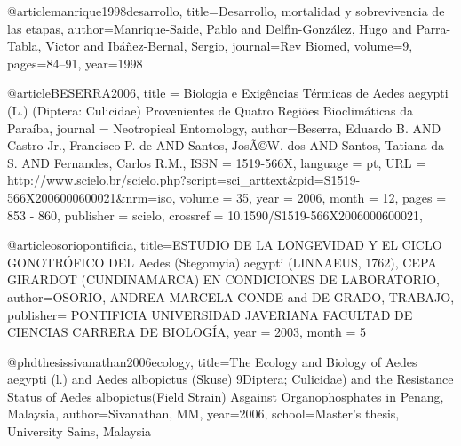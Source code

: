 
@article{manrique1998desarrollo,
  title={Desarrollo, mortalidad y sobrevivencia de las etapas},
  author={Manrique-Saide, Pablo and Delf{\'\i}n-Gonz{\'a}lez, Hugo and Parra-Tabla, Victor and Ib{\'a}{\~n}ez-Bernal, Sergio},
  journal={Rev Biomed},
  volume={9},
  pages={84--91},
  year={1998}
}

@article{BESERRA2006,
   title = {{Biologia e Exigências Térmicas de Aedes aegypti (L.) (Diptera: Culicidae)
Provenientes de Quatro Regiões Bioclimáticas da Paraíba}},
   journal = {{Neotropical Entomology}},
   author={Beserra, Eduardo B. AND Castro Jr., Francisco P. de AND Santos, Jos\~A\copyright W. dos AND Santos, Tatiana da S. AND Fernandes, Carlos R.M.},
   ISSN = {1519-566X},
   language = {pt},
   URL = {http://www.scielo.br/scielo.php?script=sci_arttext&pid=S1519-566X2006000600021&nrm=iso},
   volume = {35},
   year = {2006},
   month = {12},
   pages = {853 - 860},
   publisher = {scielo},
   crossref = {10.1590/S1519-566X2006000600021},
}

@article{osoriopontificia,
  title={ESTUDIO DE LA LONGEVIDAD Y EL CICLO GONOTRÓFICO DEL Aedes (Stegomyia) aegypti (LINNAEUS, 1762), CEPA GIRARDOT (CUNDINAMARCA) EN CONDICIONES DE LABORATORIO},
  author={OSORIO, ANDREA MARCELA CONDE and DE GRADO, TRABAJO},
  publisher= {PONTIFICIA UNIVERSIDAD JAVERIANA FACULTAD DE CIENCIAS CARRERA DE BIOLOG{\'I}A},
  year = {2003},
  month = {5}
}

@phdthesis{sivanathan2006ecology,
  title={The Ecology and Biology of Aedes aegypti (l.) and Aedes albopictus (Skuse) 9Diptera; Culicidae) and the Resistance Status of Aedes albopictus(Field Strain) Asgainst Organophosphates in Penang, Malaysia},
  author={Sivanathan, MM},
  year={2006},
  school={Master’s thesis, University Sains, Malaysia}
}